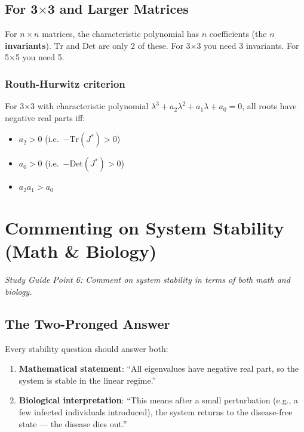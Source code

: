 \documentclass[11pt]{article}
\begin{document}
\subsection{For 3$\times$3 and Larger Matrices}

For $n\times n$ matrices, the characteristic polynomial has $n$ coefficients (the $n$ \textbf{invariants}). $\text{Tr}$ and $\text{Det}$ are only 2 of these. For 3$\times$3 you need 3 invariants. For 5$\times$5 you need 5.

\subsubsection{Routh-Hurwitz criterion} For 3$\times$3 with characteristic polynomial $\lambda^3 + a_2\lambda^2 + a_1\lambda + a_0 = 0$, all roots have negative real parts iff:
\begin{itemize}
\item $a_2 > 0$ (i.e.\ $-\text{Tr}(J^*) > 0$)
\item $a_0 > 0$ (i.e.\ $-\text{Det}(J^*) > 0$)
\item $a_2 a_1 > a_0$
\end{itemize}

\section{Commenting on System Stability (Math \& Biology)}

\textit{Study Guide Point 6: Comment on system stability in terms of both math and biology.}

\subsection{The Two-Pronged Answer}

Every stability question should answer both:

\begin{enumerate}
\item \textbf{Mathematical statement}: ``All eigenvalues have negative real part, so the system is stable in the linear regime.''

\item \textbf{Biological interpretation}: ``This means after a small perturbation (e.g., a few infected individuals introduced), the system returns to the disease-free state --- the disease dies out.''
\end{enumerate}
\end{document}

